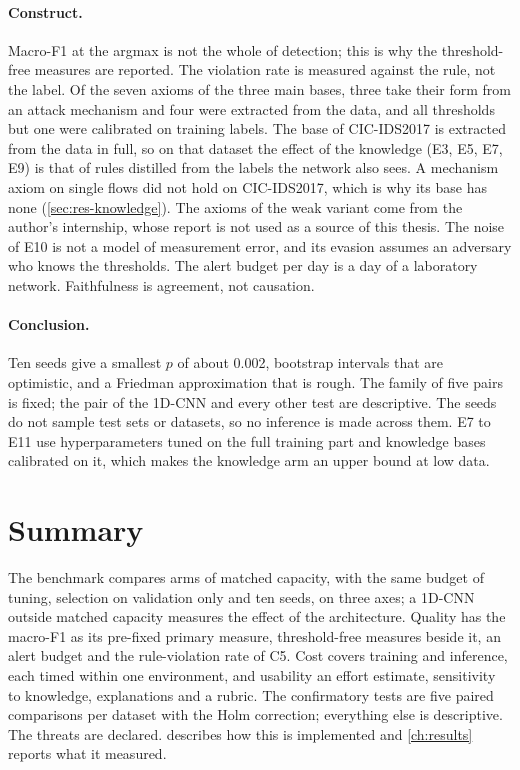 \paragraph{Construct.}
Macro-F1 at the argmax is not the whole of detection; this is why the threshold-free measures are
reported. The violation rate is measured against the rule, not the label. Of the seven axioms of
the three main bases, three take their form from an attack mechanism and four were extracted from
the data, and all thresholds but one were calibrated on training labels. The base of CIC-IDS2017 is
extracted from the data in full, so on that dataset the effect of the knowledge (E3, E5, E7, E9) is
that of rules distilled from the labels the network also sees. A mechanism axiom on single flows
did not hold on CIC-IDS2017, which is why its base has none (\cref{sec:res-knowledge}).
The axioms of the weak variant come from the author's internship, whose report is not used as a
source of this thesis. The noise of E10 is not a model of measurement error, and its evasion assumes
an adversary who knows the thresholds. The alert budget per day is a day of a laboratory network.
Faithfulness is agreement, not causation.

\paragraph{Conclusion.}
Ten seeds give a smallest $p$ of about 0.002, bootstrap intervals that are optimistic, and a
Friedman approximation that is rough. The family of five pairs is fixed; the pair of the 1D-CNN and
every other test are descriptive. The seeds do not sample test sets or datasets, so no inference is
made across them. E7 to E11 use hyperparameters tuned on the full training part and knowledge bases
calibrated on it, which makes the knowledge arm an upper bound at low data.

\section{Summary}
\label{sec:ch8-summary}

The benchmark compares arms of matched capacity, with the same budget of tuning, selection on
validation only and ten seeds, on three axes; a 1D-CNN outside matched capacity measures the
effect of the architecture. Quality has the macro-F1 as its pre-fixed primary measure,
threshold-free measures beside it, an alert budget and the rule-violation rate of C5. Cost covers
training and inference, each timed within one environment, and usability an effort estimate,
sensitivity to knowledge, explanations and a rubric. The confirmatory tests are five paired
comparisons per dataset with the Holm correction; everything else is descriptive. The threats are
declared.  describes how this is implemented and \cref{ch:results} reports
what it measured.
